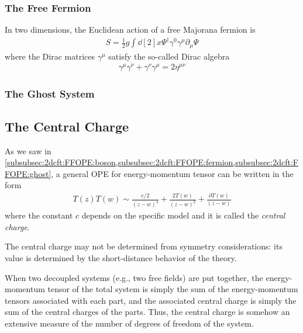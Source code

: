 \documentclass[10pt]{article}
\begin{document}
\subsubsection{The Free Fermion\label{subsubsec:2dcft:FFOPE:fermion}}
In two dimensions, the Euclidean action of a free Majorana fermion is
\begin{align}
    S=\frac{1}{2}g\int\dd[2]{x}\Psi^\dagger\gamma^0\gamma^\mu\partial_\mu\Psi
\end{align}
where the Dirac matrices $\gamma^\mu$ satisfy the so-called Dirac algebra
\begin{align}
    \gamma^\mu\gamma^\nu+\gamma^\nu\gamma^\mu=2\eta^{\mu\nu}
\end{align}
\subsubsection{The Ghost System\label{subsubsec:2dcft:FFOPE:ghost}}
\subsection{The Central Charge}
As we saw in \cref{subsubsec:2dcft:FFOPE:boson,subsubsec:2dcft:FFOPE:fermion,subsubsec:2dcft:FFOPE:ghost}, a general OPE for energy-momentum tensor can be written in the form
\begin{align}
    T(z)T(w)\sim\frac{c/2}{(z-w)^4}+\frac{2T(w)}{(z-w)^2}+\frac{\partial T(w)}{(z-w)}
\end{align}
where the constant $c$ depends on the specific model and it is called the \textit{central charge}.
\begin{remark}
    The central charge may not be determined from symmetry considerations: its value is determined by the short-distance behavior of the theory.

    When two decoupled systems (e.g., two free fields) are put together, the energy-momentum tensor of the total system is simply the sum of the energy-momentum tensors associated with each part, and the associated central charge is simply the sum of the central charges of the parts.
    Thus, the central charge is somehow an extensive measure of the number of degrees of freedom of the system.
\end{remark}
\end{document}
